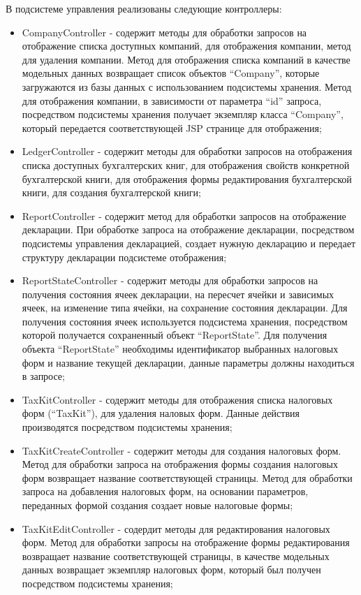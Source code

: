 \documentclass[14pt,a4paper]{reportmod}
\begin{document}
В подсистеме управления реализованы следующие контроллеры:
\begin{itemize}
  \item CompanyController - содержит методы для обработки запросов на отображение списка доступных компаний, для отображения компании, метод для удаления компании. Метод для отображения списка компаний в качестве модельных данных возвращает список объектов ``Company'', которые загружаются из базы данных с использованием подсистемы хранения. Метод для отображения компании, в зависимости от параметра ``id'' запроса, посредством подсистемы хранения получает экземпляр класса ``Company'', который передается соответствующей JSP странице для отображения;
  \item LedgerController - содержит методы для обработки запросов на отображения списка доступных бухгалтерских книг, для отображения свойств конкретной бухгалтерской книги, для отображения формы редактирования бухгалтерской книги, для создания бухгалтерской книги;
  \item ReportController - содержит метод для обработки запросов на отображение декларации. При обработке запроса на отображение декларации, посредством подсистемы управления декларацией, создает нужную декларацию и передает структуру декларации подсистеме отображения;
  \item ReportStateController - содержит методы для обработки запросов на получения состояния ячеек декларации, на пересчет ячейки и зависимых ячеек, на изменение типа ячейки, на сохранение состояния декларации. Для получения состояния ячеек используется подсистема хранения, посредством которой получается сохраненный объект ``ReportState''. Для получения объекта ``ReportState'' необходимы идентификатор выбранных налоговых форм и название текущей декларации, данные параметры должны находиться в запросе;
  \item TaxKitController - содержит методы для отображения списка налоговых форм (``TaxKit''), для удаления наловых форм. Данные действия производятся посредством подсистемы хранения;
  \item TaxKitCreateController - содержит методы для создания налоговых форм. Метод для обработки запроса на отображения формы создания налоговых форм возвращает название соответствующей страницы. Метод для обработки запроса на добавления налоговых форм, на основании параметров, переданных формой создания создает новые налоговые формы;
  \item TaxKitEditController - содердит методы для редактирования налоговых форм. Метод для обработки запросы на отображение формы редактирования возвращает название соответствующей страницы, в качестве модельных данных возвращает экземпляр налоговых форм, который был получен посредством подсистемы хранения;
\end{itemize}
\end{document}
